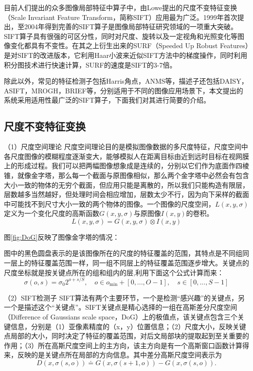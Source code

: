 目前人们提出的众多图像局部特征中算子中，由Lowe提出的尺度不变特征变换（Scale Invariant Feature Transform，简称SIFT）应用最为广泛。1999年首次提出，至2004年得到完善\cite{Lowe:2004uq}的SIFT算子是图像局部特征研究领域的一项重大突破。SIFT算子具有很强的可区分性，同时对尺度、旋转以及一定视角和光照变化等图像变化都具有不变性。在其之上衍生出来的SURF（Speeded Up Robust Features）是对SIFT的改进版本，它利用Haar小波来近似SIFT方法中的梯度操作，同时利用积分图技术进行快速计算，SURF的速度是SIFT的3-7倍。

除此以外，常见的特征检测子包括Harris角点，ANMS等，描述子还包括DAISY，ASIFT，MROGH，BRIEF等，分别适用于不同的图像应用场景下，本文提出的系统采用适用性最广泛的SIFT算子，下面我们对其进行简要的介绍。

\subsection{尺度不变特征变换}

（1）尺度空间理论
尺度空间理论目的是模拟图像数据的多尺度特征，尺度空间中各尺度图像的模糊程度逐渐变大，能够模拟人在距离目标由近到远时目标在视网膜上的形成过程。我们可以把两幅图像想象成是连续的，分别以它们作为底面作四棱锥，就像金字塔，那么每一个截面与原图像相似，那么两个金字塔中必然会有包含大小一致的物体的无穷个截面，但应用只能是离散的，所以我们只能构造有限层，层数越多当然越好，但处理时间会相应增加，层数太少不行，因为向下采样的截面中可能找不到尺寸大小一致的两个物体的图像。一个图像的尺度空间，\(L(x,y,\sigma)\)定义为一个变化尺度的高斯函数\(G(x,y,\sigma)\)与原图像\(I(x,y)\)的卷积。
\begin{equation}
  L(x,y,\sigma) = G(x,y,\sigma) \otimes I(x,y)
\end{equation}

图\ref{fig:DoG}反映了图像金字塔的情况：



图中的黑色圆盘表示的是该图像所在的尺度的特征覆盖的范围，其特点是不同组同一层上的特征覆盖范围一样，同一组不同层上的特征覆盖范围逐步增大。关键点的尺度坐标就是按关键点所在的组和组内的层,利用下面这个公式计算而来：
\begin{equation}
  \sigma(o,s) = \sigma_0 2^{o+s/S},
  \quad o \in o_{\min} + [0, ..., O-1],
  \quad s \in [0,...,S-1]
\end{equation}

（2）SIFT检测子
SIFT算法有两个主要环节，一个是检测“感兴趣”的关键点，另一个是描述这个“关键点”。SIFT关键点是精心选择的一组在高斯差分尺度空间（Difference of Gaussians scale space，DoG）上的极值点，该关键点包含三个关键信息，分别是（1）亚像素精度的（x，y）位置信息；（2）尺度大小，反映关键点局部的大小，同时决定了特征的覆盖范围，对后文局部块的提取起到至关重要的作用；（3）所在高斯尺度空间上的主方向，该主方向是有一个高斯窗口函数计算得来，反映的是关键点所在局部的方向信息。其中差分高斯尺度空间表示为
\begin{equation}
  D(x,\sigma(s,o)) \doteq G(x,\sigma(s+1,o)) - G(x,\sigma(s,o)).
\end{equation}

